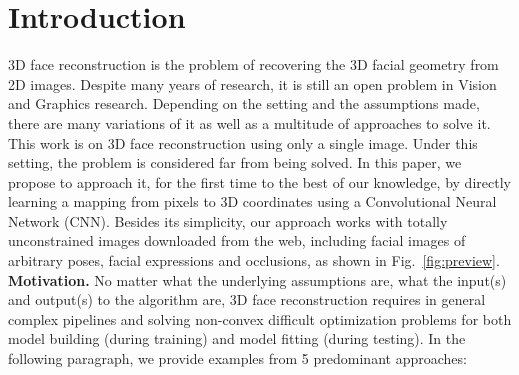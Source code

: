 \section{Introduction}
3D face reconstruction is the problem of recovering the 3D facial
geometry from 2D images. Despite many years of research, it is still
an open problem in Vision and Graphics research. Depending on the
setting and the assumptions made, there are many variations of it as
well as a multitude of approaches to solve it. This work is on 3D face
reconstruction using only a single image. Under this setting, the
problem is considered far from being solved. In this paper, we propose
to approach it, for the first time to the best of our knowledge, by
directly learning a mapping from pixels to 3D coordinates using a
Convolutional Neural Network (CNN). Besides its simplicity, our
approach works with totally unconstrained images downloaded from the
web, including facial images of arbitrary poses, facial expressions
and occlusions, as shown in Fig.~\ref{fig:preview}. \newline
\textbf{Motivation.} No matter what the underlying assumptions are,
what the input(s) and output(s) to the algorithm are, 3D face
reconstruction requires in general complex pipelines and solving
non-convex difficult optimization problems for both model building
(during training) and model fitting (during testing). In the following
paragraph, we provide examples from 5 predominant approaches:

